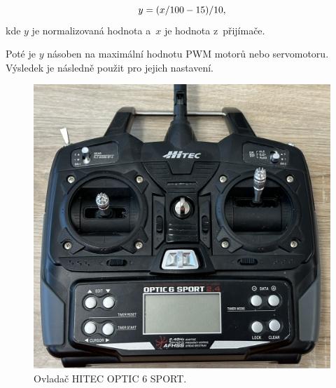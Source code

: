 \begin{equation}
	\centering
	y = (x / 100 - 15) / 10,
\end{equation}
kde $y$ je normalizovaná hodnota a~$x$ je hodnota z~přijímače. 

Poté je $y$ násoben na maximální hodnotu PWM motorů nebo servomotoru. Výsledek je 
následně použit pro jejich nastavení.

\begin{figure}[!h]
    \centering
    \includegraphics[width = .5\linewidth]{Figures/Joystick.png}
    \caption{Ovladač HITEC OPTIC 6 SPORT.}
    \label{fig:Joystick}
    \vspace{-10pt}
\end{figure}

\endinput
